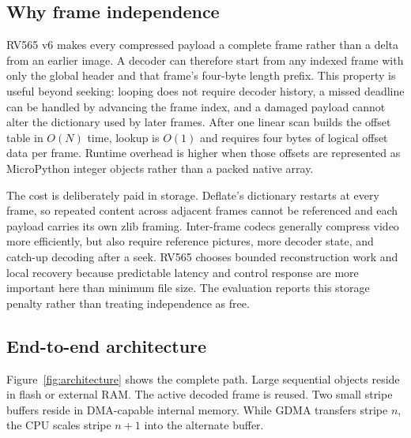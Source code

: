 \documentclass[11pt,twocolumn]{article}
\begin{document}
\subsection{Why frame independence}

RV565 v6 makes every compressed payload a complete frame rather than a delta
from an earlier image.  A decoder can therefore start from any indexed frame
with only the global header and that frame's four-byte length prefix.  This
property is useful beyond seeking: looping does not require decoder history, a
missed deadline can be handled by advancing the frame index, and a damaged
payload cannot alter the dictionary used by later frames.  After one linear
scan builds the offset table in $O(N)$ time, lookup is $O(1)$ and requires four
bytes of logical offset data per frame.  Runtime overhead is higher when those
offsets are represented as MicroPython integer objects rather than a packed
native array.

The cost is deliberately paid in storage.  Deflate's dictionary restarts at
every frame, so repeated content across adjacent frames cannot be referenced
and each payload carries its own zlib framing.  Inter-frame codecs generally
compress video more efficiently, but also require reference pictures, more
decoder state, and catch-up decoding after a seek.  RV565 chooses bounded
reconstruction work and local recovery because predictable latency and control
response are more important here than minimum file size.  The evaluation
reports this storage penalty rather than treating independence as free.

\subsection{End-to-end architecture}

Figure~\ref{fig:architecture} shows the complete path.  Large sequential
objects reside in flash or external RAM.  The active decoded frame is reused.
Two small stripe buffers reside in DMA-capable internal memory.  While GDMA
transfers stripe $n$, the CPU scales stripe $n+1$ into the alternate buffer.
\end{document}
